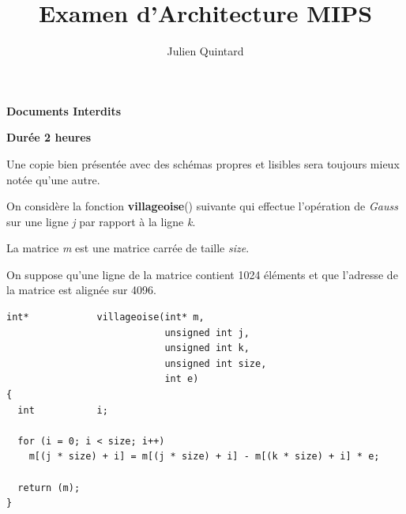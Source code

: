 
%
%



%
%


%
%

\title{Examen d'Architecture MIPS}

%
%

\author{\small{Julien Quintard}}

%
%



%
%

\maketitle

%
%

\begin{center}

\textbf{Documents Interdits}

\textbf{Dur\'ee 2 heures}

\scriptsize{Une copie bien pr\'esent\'ee avec des sch\'emas propres et
	    lisibles sera toujours mieux not\'ee qu'une autre.}
\end{center}

%
%

On consid\`ere la fonction \textbf{villageoise}() suivante qui effectue
l'op\'eration de \textit{Gauss} sur une ligne \textit{j} par rapport \`a
la ligne \textit{k}.

La matrice \textit{m} est une matrice carr\'ee de taille \textit{size}.

On suppose qu'une ligne de la matrice contient 1024 \'el\'ements
et que l'adresse de la matrice est align\'ee sur 4096.

\begin{verbatim}
int*            villageoise(int* m,
                            unsigned int j,
                            unsigned int k,
                            unsigned int size,
                            int e)
{
  int           i;

  for (i = 0; i < size; i++)
    m[(j * size) + i] = m[(j * size) + i] - m[(k * size) + i] * e;

  return (m);
}
\end{verbatim}

